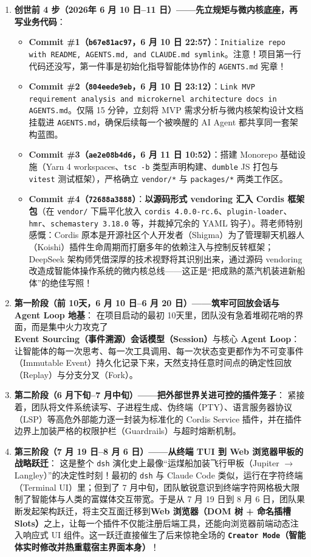 \documentclass[a4paper]{article}
\begin{document}
\begin{enumerate}
    \item \textbf{创世前 4 步（2026年 6 月 10 日--11 日）——先立规矩与微内核底座，再写业务代码}：
    \begin{itemize}
        \item \textbf{Commit \#1（\texttt{b67e81ac97}，6 月 10 日 22:57）}：\texttt{Initialize repo with README, AGENTS.md, and CLAUDE.md symlink}。注意！项目第一行代码还没写，第一件事是初始化指导智能体协作的 \texttt{AGENTS.md} 宪章！
        \item \textbf{Commit \#2（\texttt{804eede9eb}，6 月 10 日 23:12）}：\texttt{Link MVP requirement analysis and microkernel architecture docs in AGENTS.md}。仅隔 15 分钟，立刻将 MVP 需求分析与微内核架构设计文档挂载进 \texttt{AGENTS.md}，确保后续每一个被唤醒的 AI Agent 都共享同一套架构蓝图。
        \item \textbf{Commit \#3（\texttt{ae2e08b4d6}，6 月 11 日 10:52）}：搭建 Monorepo 基础设施（Yarn 4 workspaces、\texttt{tsc -b} 类型声明构建、\texttt{dumble} JS 打包与 \texttt{vitest} 测试框架），严格确立 \texttt{vendor/*} 与 \texttt{packages/*} 两类工作区。
        \item \textbf{Commit \#4（\texttt{72688a3888}）}：\textbf{以源码形式 vendoring 汇入 Cordis 框架包}（在 \texttt{vendor/} 下扁平化放入 \texttt{cordis 4.0.0-rc.6}、\texttt{plugin-loader}、\texttt{hmr}、\texttt{schemastery 3.18.0} 等，并裁掉冗余的 YAML 钩子）。蒋老师特别感慨：Cordis 原本是开源社区个人开发者（Shigma）为了管理聊天机器人（Koishi）插件生命周期而打磨多年的依赖注入与控制反转框架；DeepSeek 架构师凭借深厚的技术视野将其识别出来，通过源码 vendoring 改造成智能体操作系统的微内核总线——这正是“把成熟的蒸汽机装进新船体”的绝佳写照！
    \end{itemize}
    \item \textbf{第一阶段（前 10天，6 月 10 日--6 月 20 日）——筑牢可回放会话与 Agent Loop 地基}：
    在项目启动的最初 10天里，团队没有急着堆砌花哨的界面，而是集中火力攻克了 \textbf{Event Sourcing（事件溯源）会话模型（Session）}与核心 \textbf{Agent Loop}：让智能体的每一次思考、每一次工具调用、每一次状态变更都作为不可变事件（Immutable Event）持久化记录下来，天然支持任意时间点的确定性回放（Replay）与分支分叉（Fork）。
    \item \textbf{第二阶段（6 月下旬--7 月中旬）——把外部世界关进可控的插件笼子}：
    紧接着，团队将文件系统读写、子进程生成、伪终端（PTY）、语言服务器协议（LSP）等高危外部能力逐一封装为标准化的 Cordis Service 插件，并在插件边界上加装严格的权限护栏（Guardrails）与超时熔断机制。
    \item \textbf{第三阶段（7 月 19 日--8 月 6 日）——从终端 TUI 到 Web 浏览器甲板的战略跃迁}：
    这是整个 \texttt{dsh} 演化史上最像“运煤船加装飞行甲板（Jupiter $\to$ Langley）”的决定性时刻！最初的 \texttt{dsh} 与 Claude Code 类似，运行在字符终端（Terminal UI）里；但到了 7 月中旬，团队敏锐意识到终端字符网格极大限制了智能体与人类的富媒体交互带宽。于是从 7 月 19 日到 8 月 6 日，团队果断发起架构跃迁，将主交互面迁移到\textbf{Web 浏览器（DOM 树 + 命名插槽 Slots）}之上，让每一个插件不仅能注册后端工具，还能向浏览器前端动态注入响应式 UI 组件。这一跃迁直接催生了后来惊艳全场的 \textbf{\texttt{Creator Mode}（智能体实时修改并热重载宿主界面本身）}！
\end{enumerate}
\end{document}
